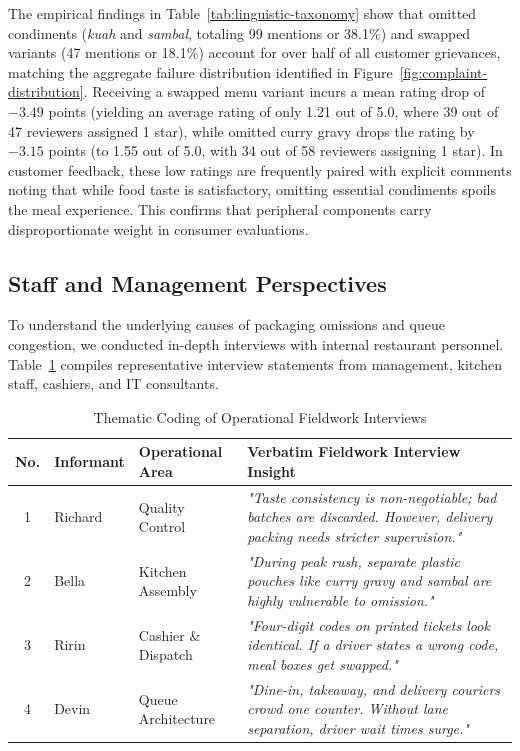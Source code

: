 \documentclass{jomas}
\begin{document}
The empirical findings in Table~\ref{tab:linguistic-taxonomy} show that omitted condiments (\textit{kuah} and \textit{sambal}, totaling 99 mentions or 38.1\%) and swapped variants (47 mentions or 18.1\%) account for over half of all customer grievances, matching the aggregate failure distribution identified in Figure~\ref{fig:complaint-distribution}. Receiving a swapped menu variant incurs a mean rating drop of $-3.49$ points (yielding an average rating of only 1.21 out of 5.0, where 39 out of 47 reviewers assigned 1 star), while omitted curry gravy drops the rating by $-3.15$ points (to 1.55 out of 5.0, with 34 out of 58 reviewers assigning 1 star). In customer feedback, these low ratings are frequently paired with explicit comments noting that while food taste is satisfactory, omitting essential condiments spoils the meal experience. This confirms that peripheral components carry disproportionate weight in consumer evaluations.

\subsection{Staff and Management Perspectives}
To understand the underlying causes of packaging omissions and queue congestion, we conducted in-depth interviews with internal restaurant personnel. Table~\ref{tab:staff-interview-quotes} compiles representative interview statements from management, kitchen staff, cashiers, and IT consultants.

\begin{table}[H]
\caption{Thematic Coding of Operational Fieldwork Interviews}
\label{tab:staff-interview-quotes}
\centering
\small
\setlength{\tabcolsep}{5pt}
\begin{tabularx}{\textwidth}{c l l X}
\toprule
\textbf{No.} & \textbf{Informant} & \textbf{Operational Area} & \textbf{Verbatim Fieldwork Interview Insight} \\
\midrule
1 & Richard & Quality Control & \textit{"Taste consistency is non-negotiable; bad batches are discarded. However, delivery packing needs stricter supervision."} \\
2 & Bella & Kitchen Assembly & \textit{"During peak rush, separate plastic pouches like curry gravy and sambal are highly vulnerable to omission."} \\
3 & Ririn & Cashier \& Dispatch & \textit{"Four-digit codes on printed tickets look identical. If a driver states a wrong code, meal boxes get swapped."} \\
4 & Devin & Queue Architecture & \textit{"Dine-in, takeaway, and delivery couriers crowd one counter. Without lane separation, driver wait times surge."} \\
\bottomrule
\end{tabularx}
\end{table}
\end{document}

